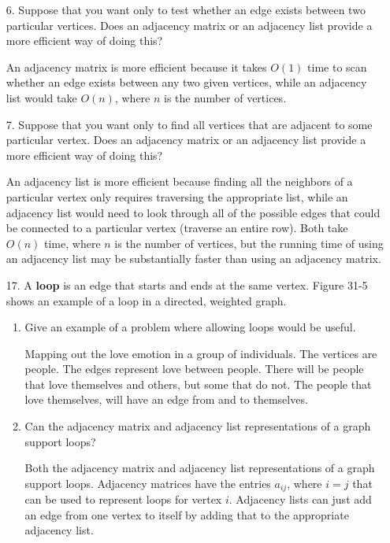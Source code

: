 \documentclass[10pt]{article}
\begin{document}
\begin{enumerate}
	\item[6.] Suppose that you want only to test whether an edge exists between two particular vertices. Does an adjacency matrix or an adjacency list provide a more efficient way of doing this?
		
		\vspace{0.5cm}
		An adjacency matrix is more efficient because it takes $O(1)$ time to scan whether an edge exists between any two given vertices, while an adjacency list would take $O(n)$, where $n$ is the number of vertices.
		\vspace{0.5cm}
	
	\item[7.] Suppose that you want only to find all vertices that are adjacent to some particular vertex. Does an adjacency matrix or an adjacency list provide a more efficient way of doing this?
	
		\vspace{0.5cm}
		An adjacency list is more efficient because finding all the neighbors of a particular vertex only requires traversing the appropriate list, while an adjacency list would need to look through all of the possible edges that could be connected to a particular vertex (traverse an entire row). Both take $O(n)$ time, where $n$ is the number of vertices, but the running time of using an adjacency list may be substantially faster than using an adjacency matrix.
		\vspace{0.5cm}
	
	\item[17.] A \textbf{loop} is an edge that starts and ends at the same vertex. Figure 31-5 shows an example of a loop in a directed, weighted graph.
		\begin{enumerate}
			\item Give an example of a problem where allowing loops would be useful.
			
				\vspace{0.5cm}
				Mapping out the love emotion in a group of individuals. The vertices are people. The edges represent love between people. There will be people that love themselves and others, but some that do not. The people that love themselves, will have an edge from and to themselves.
				\vspace{0.5cm}
				
			\item Can the adjacency matrix and adjacency list representations of a graph support loops?
				
				\vspace{0.5cm}
				Both the adjacency matrix and adjacency list representations of a graph support loops. Adjacency matrices have the entries $a_{ij}$, where $i = j$ that can be used to represent loops for vertex $i$. Adjacency lists can just add an edge from one vertex to itself by adding that to the appropriate adjacency list.
		\end{enumerate}
\end{enumerate}
\end{document}
